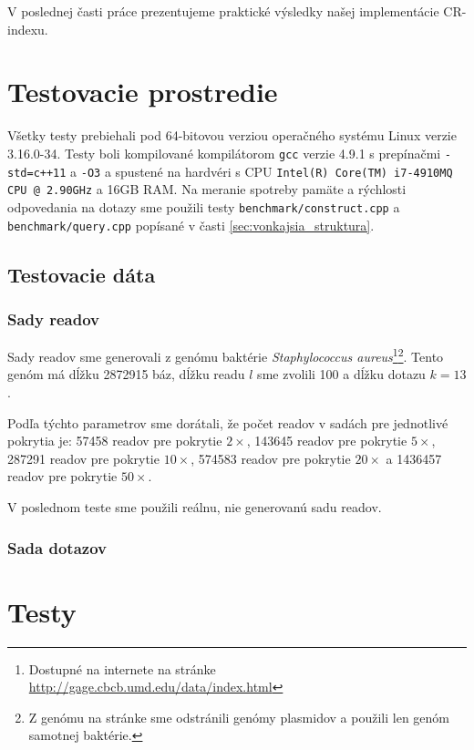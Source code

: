 V poslednej časti práce prezentujeme praktické výsledky našej implementácie CR-indexu.

\section{Testovacie prostredie}
Všetky testy prebiehali pod 64-bitovou verziou operačného systému Linux verzie 3.16.0-34. Testy boli kompilované kompilátorom \texttt{gcc} verzie 4.9.1 s prepínačmi \texttt{-std=c++11} a \texttt{-O3} a spustené na hardvéri s CPU \texttt{Intel(R) Core(TM) i7-4910MQ CPU @ 2.90GHz} a 16GB RAM. Na meranie spotreby pamäte a rýchlosti odpovedania na dotazy sme použili testy \texttt{benchmark/construct.cpp} a \texttt{benchmark/query.cpp} popísané v časti \ref{sec:vonkajsia_struktura}.

\subsection{Testovacie dáta}
\subsubsection{Sady readov}
Sady readov sme generovali z genómu baktérie \emph{Staphylococcus aureus}\footnote{Dostupné na internete na stránke \url{http://gage.cbcb.umd.edu/data/index.html}}\footnote{Z genómu na stránke sme odstránili genómy plasmidov a použili len genóm samotnej baktérie.}. Tento genóm má dĺžku 2872915 báz, dĺžku readu $l$ sme zvolili 100 a dĺžku dotazu $k=13$. 

Podľa týchto parametrov sme dorátali, že počet readov v sadách pre jednotlivé pokrytia je: 57458 readov pre pokrytie $2\times$, 143645 readov pre pokrytie $5\times$, 287291 readov pre pokrytie $10\times$, 574583 readov pre pokrytie $20\times$ a 1436457 readov pre pokrytie $50\times$.

V poslednom teste sme použili reálnu, nie generovanú sadu readov. %

\subsubsection{Sada dotazov}

\section{Testy}

